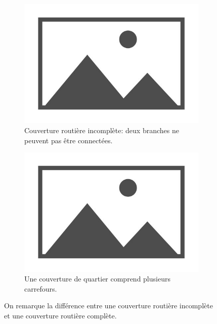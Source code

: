 \begin{figure}
    \centering
    \begin{subfigure}[t]{.49\linewidth}
        \includegraphics[width=\textwidth]{images/placeholder.jpg}
        \caption{Couverture routière incomplète: deux branches ne peuvent pas être connectées.\label{fig:mod_ex_couverture_routiere_incomplete}}
    \end{subfigure}
    \begin{subfigure}[t]{.49\linewidth}
        \includegraphics[width=\textwidth]{images/placeholder.jpg}
        \caption{Une couverture de quartier comprend plusieurs carrefours. \label{fig:mod_ex_couverture_routiere_carrefour}}
    \end{subfigure}
    \caption{On remarque la différence entre une couverture routière incomplète et une couverture routière complète.}
    \label{fig:mod_ex_couverture_routiere_quartier}
\end{figure}

